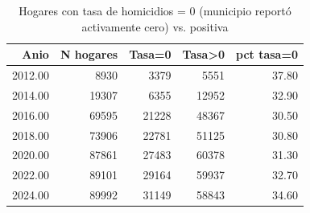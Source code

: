 \begin{table}[ht]
\centering
\caption{Hogares con tasa de homicidios = 0 (municipio reportó activamente cero) vs. positiva} 
\label{tab:muni_M5b_tasa_cero_en_base}
\begin{tabular}{rrrrr}
  \toprule
Anio & N hogares & Tasa=0 & Tasa>0 & pct tasa=0 \\ 
  \midrule
2012.00 & 8930 & 3379 & 5551 & 37.80 \\ 
  2014.00 & 19307 & 6355 & 12952 & 32.90 \\ 
  2016.00 & 69595 & 21228 & 48367 & 30.50 \\ 
  2018.00 & 73906 & 22781 & 51125 & 30.80 \\ 
  2020.00 & 87861 & 27483 & 60378 & 31.30 \\ 
  2022.00 & 89101 & 29164 & 59937 & 32.70 \\ 
  2024.00 & 89992 & 31149 & 58843 & 34.60 \\ 
   \bottomrule
\end{tabular}
\end{table}
